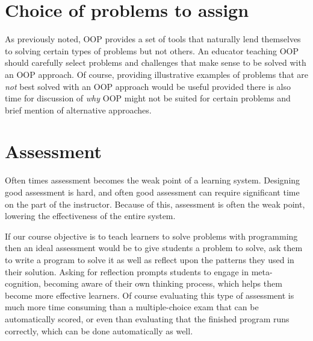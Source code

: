 \documentclass[12pt]{article}
\begin{document}
\section{Choice of problems to assign}
As previously noted, OOP provides a set of tools that naturally lend
themselves to solving certain types of problems but not others. An
educator teaching OOP should carefully select problems and challenges
that make sense to be solved with an OOP approach. Of course,
providing illustrative examples of problems that are \emph{not} best
solved with an OOP approach would be useful provided there is also
time for discussion of \emph{why} OOP might not be suited for certain
problems and brief mention of alternative approaches.

\section{Assessment}
Often times assessment becomes the weak point of a learning
system. Designing good assessment is
hard\autocite{lister_blooming_2000,traynor_synthesis_2005}, and often good assessment can
require significant time on the part of the instructor. Because of
this, assessment is often the weak point, lowering the effectiveness
of the entire system.

If our course objective is to teach learners to solve problems with
programming then an ideal assessment would be to give students a
problem to solve, ask them to write a program to solve it as well as
reflect upon the patterns they used in their solution. Asking for
reflection prompts students to engage in meta-cognition, becoming
aware of their own thinking process, which helps them become more
effective
learners\autocite{ambrose_how_2010,chi_selfexplanations_1989}. Of
course evaluating this type of assessment is much more time consuming
than a multiple-choice exam that can be automatically scored, or even
than evaluating that the finished program runs correctly, which can be
done automatically as well\autocite{cheang_automated_2003}.
\end{document}
